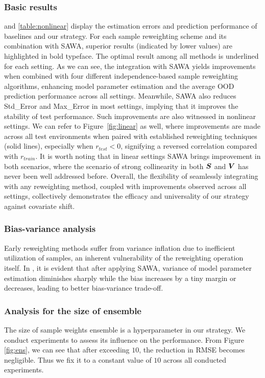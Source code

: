 \subsubsection{Basic results}  and \ref{table:nonlinear} display the estimation errors and prediction performance of baselines and our strategy. For each sample reweighting scheme and its combination with SAWA, superior results (indicated by lower values) are highlighted in bold typeface. The optimal result among all methods is underlined for each setting. 
As we can see, the integration with SAWA yields improvements when combined with four different independence-based sample reweighting algorithms, enhancing model parameter estimation and the average OOD prediction performance across all settings. 
Meanwhile, SAWA also reduces Std\_Error and Max\_Error in most settings, implying that it improves the stability of test performance. 
Such improvements are also witnessed in nonlinear settings. 
We can refer to Figure~\ref{fig:linear} as well, where improvements are made across all test environments when paired with established reweighting techniques (solid lines), especially when $r_{test}<0$, signifying a reversed correlation compared with $r_{train}$. 
It is worth noting that in linear settings SAWA brings improvement in both scenarios, where the scenario of strong collinearity in both $\boldsymbol{S}$ and $\boldsymbol{V}$ has never been well addressed before. 
Overall, the flexibility of seamlessly integrating with any reweighting method, coupled with improvements observed across all settings, collectively demonstrates the efficacy and universality of our strategy against covariate shift. 


\subsubsection{Bias-variance analysis} Early reweighting methods suffer from variance inflation due to inefficient utilization of samples, an inherent vulnerability of the reweighting operation itself. 
In , it is evident that after applying SAWA, variance of model parameter estimation diminishes sharply while the bias increases by a tiny margin or decreases, leading to better bias-variance trade-off. 

\subsubsection{Analysis for the size of ensemble} The size of sample weights ensemble is a hyperparameter in our strategy. We conduct experiments to assess its influence on the performance. From Figure \ref{fig:ens}, we can see that after exceeding $10$, the reduction in RMSE becomes negligible. Thus we fix it to a constant value of $10$ across all conducted experiments. 




